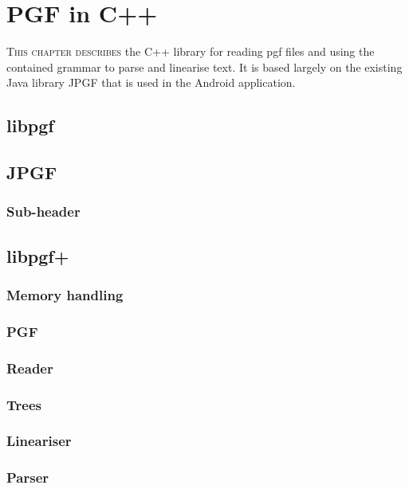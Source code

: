 \chapter{PGF in C++}
\lettrine[lines=4, loversize=-0.1, lraise=0.1]{T}{his chapter describes} the C++ library for reading pgf files and using the contained grammar to parse and linearise text. It is based largely on the existing Java library JPGF that is used in the Android application.
\section{libpgf}
\section{JPGF}
\subsection{Sub-header}
\section{libpgf+}
\subsection{Memory handling}
\subsection{PGF}
\subsection{Reader}
\subsection{Trees}
\subsection{Lineariser}
\subsection{Parser}

